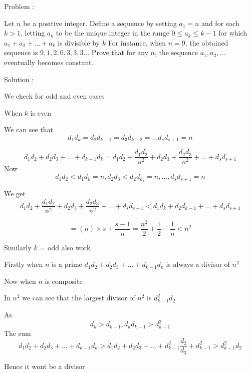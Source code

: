 Problem :

Let $n$ be a positive integer. Define a sequence by setting $a_1 = n$ and for each $k > 1$, letting $a_k$ to be the unique integer in the range
$0 \le a_k \le k-1$ for which $a_1 + a_2 + \dots + a_k$ is divisible by $k$ For instance, when $n = 9$, the obtained sequence is $9,1,2,0,3,3,3 \dots $ Prove that for any $n$, the sequence $a_1,a_2, \dots $
eventually becomes constant.

Solution :

We check for odd and even cases

When $k$ is even 


We can see that  \[ d_1d_k=d_2d_{k-1}=d_3d_{k-2}= \dots d_sd_{s+1}=n \]

 \[ d_1d_2 + d_2d_3 + \dots + d_{k-1}d_k = d_1d_2 +\frac{d_1d_2}{n^2} + d_2d_3+\frac{d_2d_3}{n^2} + \dots + d_{s}d_{s+1} \]  Now  \[d_1d_2<d_1d_k=n, d_2d_3<d_2d_{k_1}=n , \dots , d_sd_{s+1}=n \]
 
 We get \[ d_1d_2 +\frac{d_1d_2}{n^2} + d_2d_3+\frac{d_2d_3}{n^2} + \dots + d_{s}d_{s+1} < d_1d_k+d_2d_{k-1}+ \dots+d_sd_{s+1} \]
 
 \[ = (n)\times s + \frac{s-1}{n} = \frac{n^2}{2} + \frac{1}{2} -\frac{1}{n} < n^2 \]
 
 
 
 Similarly $k$ = odd also work

Firstly when $n$ is a prime $d_1d_2 + d_2d_3 + \dots + d_{k-1}d_k$ is always a divisor of $n^2$

Now when $n$ is composite 

In $n^2$ we can see that the largest divisor of $n^2$ is $d_{k-1}^2d_2$ 

As  \[ d_k>d_{k-1} , d_kd_{k-1}>d_{k-1}^2 \] The sum \[ d_1d_2 + d_2d_3 + \dots + d_{k-1}d_k > d_1d_2+ d_2d_3 + \dots + d_{k-1}^2\frac{d_2}{d_3} + d_{k-1}^2 > d_{k-1}^2d_2 \] 

Hence it wont be a divisor
